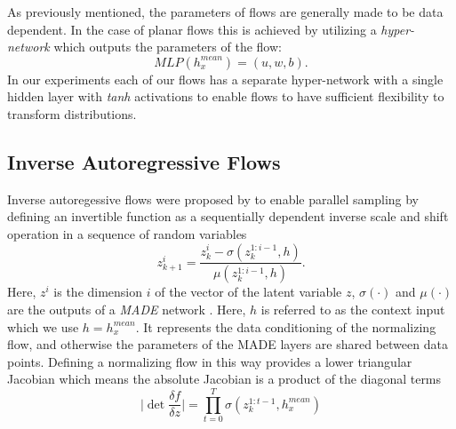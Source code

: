

As previously mentioned, the parameters of flows are generally made to be data dependent. In the case of planar flows this is achieved by utilizing a \textit{hyper-network} \cite{ha2016hypernets} which outputs the parameters of the flow:
 \begin{equation}
 MLP(h^{mean}_{x}) = (u, w, b).
 \end{equation}
In our experiments each of our flows has a separate hyper-network with a single hidden layer with \textit{tanh} activations to enable flows to have sufficient flexibility to transform distributions.
 
\subsection{Inverse Autoregressive Flows}
Inverse autoregessive flows were proposed by \citet{kingma2016IAF} to enable parallel sampling by defining an invertible function as a sequentially dependent  inverse scale and shift  operation in a sequence of random variables
\begin{equation}
z_{k+1}^{i} = \frac{z_{k}^{i} - \sigma(z_{k}^{1:i-1}, h)}{\mu(z_{k}^{1:i-1}, h)}.
\end{equation}
Here, $z^{i}$ is the dimension $i$ of the vector of the latent variable $z$, $\sigma(\cdot)$ and $\mu(\cdot)$ are the outputs of a \textit{MADE} network \cite{MADE2015germain}. Here, $h$ is referred to as the context input which we use $h= h^{mean}_{x}$. It represents the data conditioning of the normalizing flow, and otherwise the parameters of the MADE layers are shared between data points. Defining a normalizing flow in this way provides a lower triangular Jacobian which means the absolute Jacobian is a product of the diagonal terms 
\begin{equation}
\bigg| \det \frac{\delta f}{\delta z} \bigg| = \prod_{t=0}^{T} \sigma(z_{k}^{1:t-1}, h^{mean}_{x})
\end{equation}

